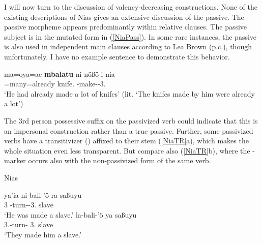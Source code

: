 
I will now turn to the discussion of valency-decreasing constructions.
None of the existing descriptions of Nias gives an extensive discussion of the passive. 
The passive morpheme appears predominantly within relative clauses.
The passive subject is in the mutated form in (\ref{NiaPass}). 
In some rare instances, the passive is also used in independent main clauses according to Lea Brown (p.c.), though unfortunately, I have no example sentence to demonstrate this behavior. 

\begin{exe}\ex\label{NiaPass}
\gll ma=oya=ae \textbf{mbalatu} ni-n\"o\ss \"o-i-nia\\
\pfv{}=many=already knife.\mut{} \pass{}-make-\transitiv{}-3\sg{}.\poss{}\\
\glt `He had already made a lot of knifes' (lit. `The knifes made by him were already a lot')
\end{exe}

The 3rd person possessive suffix on the passivized verb could indicate that this is an impersonal construction rather than a true passive.
Further, some passivized verbs have a transitivizer (\transitiv{}) affixed to their stem (\ref{NiaTR}a), which makes the whole situation even less transparent. But compare also (\ref{NiaTR}b), where the \transitiv{}-marker occurs also with the non-passivized form of the same verb. 

\begin{exe}\ex\label{NiaTR} {Nias} \citep[556, 555]{Brown:2001}\nopagebreak[4]
\begin{xlist}
\ex\gll ya'ia ni-bali-'\"o-ra sa\ss uyu\\
3\sg{} \pass{}-turn-\transitiv{}-3\pl{}.\poss{} slave\\
`He was made a slave.'
\ex\gll la-bali-'\"o ya sa\ss uyu\\
3\pl{}.\rls{}-turn-\transitiv{} 3\sg{}.\mut{} slave\\
`They made him a slave.'
\end{xlist}

\end{exe}

